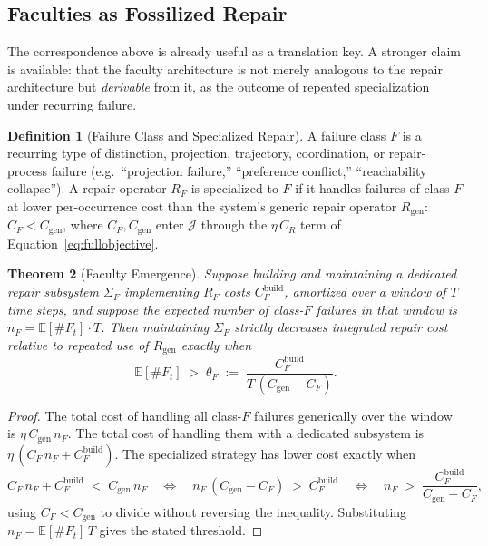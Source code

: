 \documentclass[11pt]{article}
\theoremstyle{plain}
\newtheorem{theorem}{Theorem}[section]
\theoremstyle{definition}
\newtheorem{definition}[theorem]{Definition}
\theoremstyle{remark}
\begin{document}
\subsection{Faculties as Fossilized Repair}

The correspondence above is already useful as a translation key. A stronger claim is available: that the faculty architecture is not merely analogous to the repair architecture but \emph{derivable} from it, as the outcome of repeated specialization under recurring failure.

\begin{definition}[Failure Class and Specialized Repair]
A failure class $F$ is a recurring type of distinction, projection, trajectory, coordination, or repair-process failure (e.g.\ ``projection failure,'' ``preference conflict,'' ``reachability collapse''). A repair operator $R_F$ is specialized to $F$ if it handles failures of class $F$ at lower per-occurrence cost than the system's generic repair operator $R_{\mathrm{gen}}$: $C_F < C_{\mathrm{gen}}$, where $C_F, C_{\mathrm{gen}}$ enter $\mathcal{J}$ through the $\eta\,C_R$ term of Equation~\eqref{eq:fullobjective}.
\end{definition}

\begin{theorem}[Faculty Emergence]
\label{thm:faculty}
Suppose building and maintaining a dedicated repair subsystem $\Sigma_F$ implementing $R_F$ costs $C_F^{\mathrm{build}}$, amortized over a window of $T$ time steps, and suppose the expected number of class-$F$ failures in that window is $n_F = \mathbb{E}[\#F_t]\cdot T$. Then maintaining $\Sigma_F$ strictly decreases integrated repair cost relative to repeated use of $R_{\mathrm{gen}}$ exactly when
\[
\mathbb{E}[\#F_t] \;>\; \theta_F \;:=\; \frac{C_F^{\mathrm{build}}}{T\,(C_{\mathrm{gen}} - C_F)}.
\]
\end{theorem}
\begin{proof}
The total cost of handling all class-$F$ failures generically over the window is $\eta\, C_{\mathrm{gen}}\, n_F$. The total cost of handling them with a dedicated subsystem is $\eta\,(C_F\, n_F + C_F^{\mathrm{build}})$. The specialized strategy has lower cost exactly when
\[
C_F\, n_F + C_F^{\mathrm{build}} \;<\; C_{\mathrm{gen}}\, n_F
\quad\Longleftrightarrow\quad
n_F \,(C_{\mathrm{gen}} - C_F) \;>\; C_F^{\mathrm{build}}
\quad\Longleftrightarrow\quad
n_F \;>\; \frac{C_F^{\mathrm{build}}}{C_{\mathrm{gen}}-C_F},
\]
using $C_F < C_{\mathrm{gen}}$ to divide without reversing the inequality. Substituting $n_F = \mathbb{E}[\#F_t]\, T$ gives the stated threshold.
\end{proof}
\end{document}
